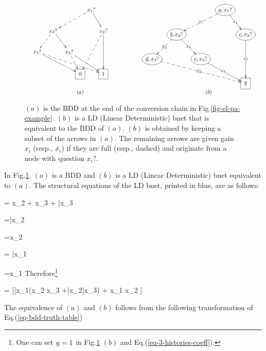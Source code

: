\begin{figure}[h!]
$$
\begin{array}{cc}
\xymatrix@C=.1pc{
&&&&&&&x_1?\ar@{-->}[dllll]
\ar[dr]
\\
&&&x_2?\ar@{-->}[dll]\ar[drr]
&&&&&x_2?\ar@{-->}[ddll]\ar[dd]
\\
&x_3?\ar@{-->}[drrrrrrr]\ar[drrrrr]
&&&&x_3?\ar@{-->}[dr]\ar[drrr]
\\
&&
&&
&&\Rect{0}
&&\Rect{1}
&&
&&
&&
}
&
\xymatrix@C=.1pc{
&&&&&&&\Circle{\rva, x_1?}\ar@{-->}[dllll]|{\ol{x_1}}
\ar[dr]|{x_1}
\\
&&&\Circle{\rvb, x_2?}\ar@{-->}[dll]|{\ol{x_2}}\ar[drr]|{x_2}
&&&&&\Circle{\rvc, x_2?}\ar[dd]|{x_2}
\\
&\Circle{\rvd, x_3?}\ar@{-->}[drrrrrrr]|{\ol{x_3}}
&&&&\Circle{\rve, x_3?}\ar[drrr]|{x_3}
\\
&&
&&
&&
&&\Rect{\ul{y}}
&&
&&
&&
}
\\
(a) & (b)
\end{array}
$$
\caption{
$(a)$ 
is the BDD 
at the end of the
conversion chain in  Fig.\ref{fig-el-pa-example}.
$(b)$ 
is a LD (Linear Deterministic) bnet that
is equivalent to the BDD of
$(a)$. $(b)$ is
obtained by keeping a subset of the arrows in $(a)$. The remaining
arrows are given gain $x_i$
(resp., $\bar{x}_i$) if they are full 
(resp., dashed) and originate from
a node with question $x_i?$.
}
\label{fig-bdd-to-bnet}
\end{figure}




In Fig.\ref{fig-bdd-to-bnet}, $(a)$
is a BDD and 
$(b)$ is a LD (Linear Deterministic) bnet equivalent to $(a)$.
The structural equations of the LD bnet, printed in blue,
are as follows:

\beq\color{blue}
\rvy=  x_2 \rvc + x_3 \rve + \bar{x}_3\rvd
\eeq

\beq\color{blue}
\rvd=\bar{x}_2\rvb
\eeq

\beq\color{blue}
\rve=x_2\rvb
\eeq

\beq\color{blue}
\rvb = \bar{x}_1\rva
\eeq

\beq\color{blue}
\rvc=x_1\rva
\eeq
Therefore\footnote{One can set $\rva=1$ in 
Fig.\ref{fig-bdd-to-bnet} $(b)$
and Eq.(\ref{eq-3-histories-coeff}).}

\beq
\rvy = [\bar{x}_1(x_2 x_3 +\bar{x}_2\bar{x}_3)
+ x_1 x_2
]\rva
\label{eq-3-histories-coeff}
\eeq

The equivalence of $(a)$ and $(b)$
follows from the following transformation
of Eq.(\ref{eq-bdd-truth-table})

